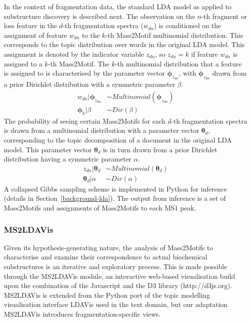 In the context of fragmentation data, the standard LDA model as applied to substructure discovery is described next. The observation on the $n$-th fragment or loss feature in the $d$-th fragmentation spectra ($w_{dn}$) is conditioned on the assignment of feature $w_{dn}$ to the $k$-th Mass2Motif multinomial distribution. This corresponds to the topic distribution over words in the original LDA model. This assignment is denoted by the indicator variable $z_{dn}$, so $z_{dn}=k$ if feature $w_{dn}$ is assigned to a $k$-th Mass2Motif. The $k$-th multinomial distribution that a feature is assigned to is characterised by the parameter vector $\boldsymbol{\phi}_{z_{dn}}$, with $\boldsymbol{\phi}_{z_{dn}}$ drawn from a prior Dirichlet distribution with a symmetric parameter $\beta$. 
\begin{align}
w_{dn} \vert \boldsymbol{\phi}_{z_{dn}} &\sim Multinomial(\boldsymbol{\phi}_{z_{dn}}) \\
\boldsymbol{\phi}_{k} \vert \beta &\sim Dir(\beta)
\end{align}
The probability of seeing certain Mass2Motifs for each $d$-th fragmentation spectra is drawn from a multinomial distribution with a parameter vector $\boldsymbol{\theta}_{d}$, corresponding to the topic decomposition of a document in the original LDA model. This parameter vector $\boldsymbol{\theta}_{d}$ is in turn drawn from a prior Dirichlet distribution having a symmetric parameter $\alpha$. 
\begin{align}
z_{dn} \vert \boldsymbol{\theta}_{d} &\sim Multinomial(\boldsymbol{\theta}_{d}) \\
\boldsymbol{\theta}_{d} \vert \alpha &\sim Dir(\alpha)
\end{align}
A collapsed Gibbs sampling scheme is implemented in Python for inference (details in Section~\ref{background-lda}). The output from inference is a set of Mass2Motifs and assignments of Mass2Motifs to each MS1 peak. 

\subsubsection{MS2LDAVis}


Given its hypothesis-generating nature, the analysis of Mass2Motifs to characterise and examine their correspondence to actual biochemical substructures is an iterative and exploratory process. This is made possible through the MS2LDAVis module, an interactive web-based visualisation build upon the combination of the Javascript and the D3 library (http://d3js.org). MS2LDAVis is extended from the Python port of the topic modelling visualisation interface LDAVis \cite{Sievert2014} used in the text domain, but our adaptation MS2LDAVis introduces fragmentation-specific views.

